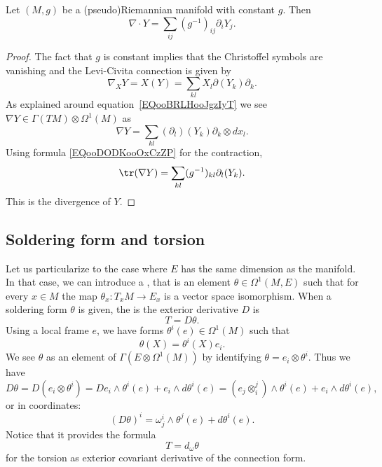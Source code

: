 \begin{proposition} \label{PROPooLIJTooKFTwPY}
    Let \( (M,g)\) be a (pseudo)Riemannian manifold with constant \( g\). Then
    \begin{equation}
        \nabla\cdot Y=\sum_{ij}(g^{-1})_{ij}\partial_iY_j.
    \end{equation}
\end{proposition}

\begin{proof}
    The fact that \( g\) is constant implies that the Christoffel symbols are vanishing and the Levi-Civita connection is given by
    \begin{equation}
        \nabla_XY=X(Y)=\sum_{kl}X_l\partial(Y_k)\partial_k.
    \end{equation}
    As explained around equation~\ref{EQooBRLHooJgzIyT} we see \( \nabla Y\in\Gamma(TM)\otimes \Omega^1(M)\) as
    \begin{equation}
        \nabla Y=\sum_{kl}(\partial_l)(Y_k)\partial_k\otimes dx_l.
    \end{equation}
    Using formula \eqref{EQooDODKooOxCzZP} for the contraction,
    \begin{equation}
        \tr(\nabla Y)=\sum_{kl}(g^{-1})_{kl}\partial_l(Y_k).
    \end{equation}
    This is the divergence of \( Y\).
\end{proof}

\subsection{Soldering form and torsion}

Let us particularize to the case where $E$ has the same dimension as the manifold. In that case, we can introduce a , that is an element $\theta\in \Omega^1(M,E)$ such that for every $x\in M$ the map $\theta_x\colon T_xM\to E_x$ is a vector space isomorphism.
When a soldering form $\theta$ is given, the  is the exterior derivative $D$ is
\begin{equation}
	T=D\theta.
\end{equation}
Using a local frame $e$, we have forms $\theta^i(e)\in\Omega^1(M)$ such that
\[
  \theta(X)=\theta^i(X)e_i.
\]
We see $\theta$ as an element of $\Gamma(E\otimes \Omega^1(M))$ by identifying $\theta=e_i\otimes\theta^i$. Thus we have
\[
D\theta=D(e_i\otimes\theta^i)	=De_i\wedge\theta^i(e)+e_i\wedge d\theta^i(e)
				=(e_j\otimes^j_i)\wedge\theta^i(e)+e_i\wedge d\theta^i(e),
\]
or in coordinates:
\begin{equation}
  (D\theta)^i=\omega_j^i\wedge \theta^j(e)+d\theta^i(e).
\end{equation}
Notice that it provides the formula
\begin{equation}
T=d_{\omega}\theta
\end{equation}
for the torsion as exterior covariant derivative of the connection form.

